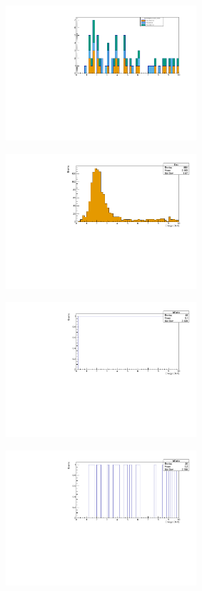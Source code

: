 \documentclass[12pt]{article}
\begin{document}
\begin{figure}[h]
\begin{subfigure}{0.49\textwidth}
   \caption{}
   \label{}
  \end{subfigure}
  \begin{subfigure}{0.49\textwidth}
   \centering
   \includegraphics[width=0.95\linewidth,height=5cm]{./figures/validgenie_nue_Enu_stacked.pdf}
   \caption{}
   \label{}
  \end{subfigure}
  \begin{subfigure}{0.49\textwidth}
   \centering
   \includegraphics[width=0.95\linewidth,height=5cm]{./figures/validgenie~Enu-Files~valid-hist-root.pdf}
   \caption{}
   \label{}
  \end{subfigure}
  \begin{subfigure}{0.49\textwidth}
   \centering
   \includegraphics[width=0.95\linewidth,height=5cm]{./figures/validgenie_Enu_ratio.pdf}
   \caption{}
   \label{}
  \end{subfigure}
  \begin{subfigure}{0.49\textwidth}
   \centering
   \includegraphics[width=0.95\linewidth,height=5cm]{./figures/validgenie_nue_Enu_ratio.pdf}
   \caption{}
   \label{}
  \end{subfigure}
\end{figure}
\end{document}
